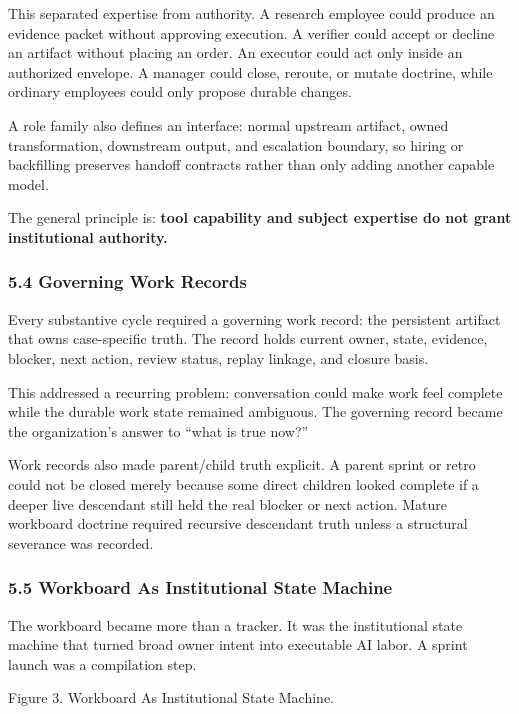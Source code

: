 \documentclass[
]{article}
\begin{document}
This separated expertise from authority. A research employee could produce an evidence packet without approving execution. A verifier could accept or decline an artifact without placing an order. An executor could act only inside an authorized envelope. A manager could close, reroute, or mutate doctrine, while ordinary employees could only propose durable changes.

A role family also defines an interface: normal upstream artifact, owned transformation, downstream output, and escalation boundary, so hiring or backfilling preserves handoff contracts rather than only adding another capable model.

The general principle is: \textbf{tool capability and subject expertise do not grant institutional authority.}

\subsubsection{5.4 Governing Work Records}\label{governing-work-records}

Every substantive cycle required a governing work record: the persistent artifact that owns case-specific truth. The record holds current owner, state, evidence, blocker, next action, review status, replay linkage, and closure basis.

This addressed a recurring problem: conversation could make work feel complete while the durable work state remained ambiguous. The governing record became the organization's answer to ``what is true now?''

Work records also made parent/child truth explicit. A parent sprint or retro could not be closed merely because some direct children looked complete if a deeper live descendant still held the real blocker or next action. Mature workboard doctrine required recursive descendant truth unless a structural severance was recorded.

\subsubsection{5.5 Workboard As Institutional State Machine}\label{workboard-as-institutional-state-machine}

The workboard became more than a tracker. It was the institutional state machine that turned broad owner intent into executable AI labor. A sprint launch was a compilation step.

Figure 3. Workboard As Institutional State Machine.
\end{document}
